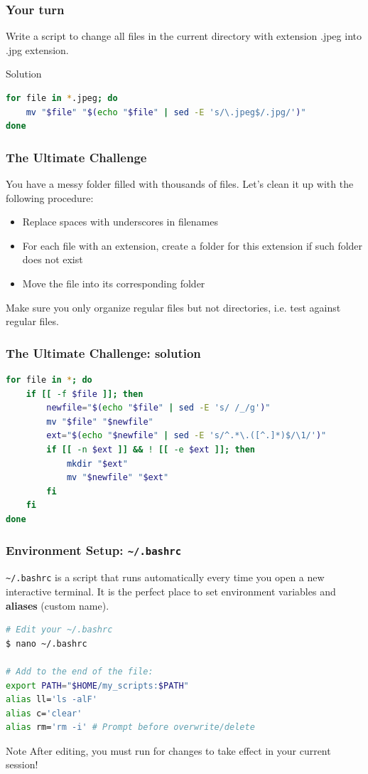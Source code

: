 \begin{frame}[fragile]
\frametitle{Your turn}
Write a script to change all files in the current directory with extension
.jpeg into .jpg extension.
\pause
\begin{block}{Solution}
\begin{lstlisting}[language=bash]
for file in *.jpeg; do
    mv "$file" "$(echo "$file" | sed -E 's/\.jpeg$/.jpg/')"
done
\end{lstlisting}
\end{block}
\end{frame}

\begin{frame}[fragile]
\frametitle{The Ultimate Challenge}
You have a messy folder filled with thousands of files. Let's clean it up with
the following procedure:
\begin{itemize}
    \item Replace spaces with underscores in filenames
    \item For each file with an extension, create a folder for this extension if such
folder does not exist
    \item Move the file into its corresponding folder
\end{itemize}
Make sure you only organize regular files but not directories, i.e. test
against regular files.
\end{frame}

\begin{frame}[fragile]
\frametitle{The Ultimate Challenge: solution}
\begin{lstlisting}[language=bash]
for file in *; do
    if [[ -f $file ]]; then
        newfile="$(echo "$file" | sed -E 's/ /_/g')"
        mv "$file" "$newfile"
        ext="$(echo "$newfile" | sed -E 's/^.*\.([^.]*)$/\1/')"
        if [[ -n $ext ]] && ! [[ -e $ext ]]; then
            mkdir "$ext"
            mv "$newfile" "$ext"
        fi
    fi
done
\end{lstlisting}
\end{frame}

\begin{frame}[fragile]
\frametitle{Environment Setup: \texttt{\textasciitilde/.bashrc}}
\texttt{\textasciitilde/.bashrc} is a script that runs automatically every time you open a new interactive terminal. 
\newline \newline
It is the perfect place to set environment variables and \textbf{aliases} (custom name).
\begin{lstlisting}[language=bash]
# Edit your ~/.bashrc
$ nano ~/.bashrc

# Add to the end of the file:
export PATH="$HOME/my_scripts:$PATH"
alias ll='ls -alF'
alias c='clear'
alias rm='rm -i' # Prompt before overwrite/delete
\end{lstlisting}
\begin{block}{Note}
After editing, you must run  for changes to take effect in your current session!
\end{block}
\end{frame}

